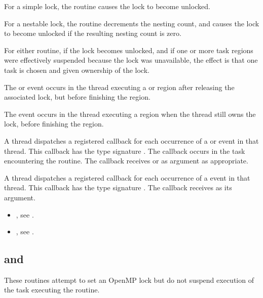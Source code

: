 \effect
For a simple lock, the  routine causes the lock to become unlocked.

For a nestable lock, the  routine decrements the nesting 
count, and causes the lock to become unlocked if the resulting nesting count is zero.

For either routine, if the lock becomes unlocked, and if one or more task 
regions were effectively suspended because the lock was unavailable, the 
effect is that one task is chosen and given ownership of the lock. 

\events

The  or  event occurs in the thread 
executing a  or  region
after releasing the associated lock, but before finishing the region.

The  event occurs in the thread 
executing a  region
when the thread still owns the lock, 
before finishing the region.


\tools

A thread dispatches a registered 
callback for each occurrence of a  or  event 
in that thread.  This callback has the type signature .
The callback occurs in the task encountering
the routine. The callback receives  or 
  as  argument as appropriate.

A thread dispatches a registered 
callback for each occurrence of a  event 
in that thread. This callback has the type signature .
The callback receives  as its  argument.

\crossreferences
\begin{itemize}
\item {}, see
.
\item {}, see
.
\end{itemize}








\subsection{ and }
\label{subsec:omp_test_lock and omp_test_nest_lock}
\summary
These routines attempt to set an OpenMP lock but do not suspend execution of the task 
executing the routine.

